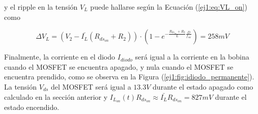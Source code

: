 y el ripple en la tensión $V_L$ puede hallarse según la Ecuación (\ref{ej1:eq:VL_on}) como

\begin{equation}
\Delta V_L = \left( V_2 - \bar{I_L} (R_{ds_{on}}+R_2) \right) \cdot (1-e^{-\frac{R_{ds_{on}} + R_2}{L}\frac{D}{f_{sw}}}) = 258mV
\end{equation}

Finalmente, la corriente en el diodo $I_{diodo}$ será igual a la corriente en la bobina cuando el MOSFET se encuentra apagado, y nula cuando el MOSFET se encuentra prendido, como se observa en la Figura (\ref{ej1:fig:idiodo_permanente}). La tensión $V_{ds}$ del MOSFET será igual a $13.3V$ durante el estado apagado como calculado en la sección anterior y $I_{L_{on}}(t)R_{ds_{on}} \approx \bar{I_L}R_{ds_{on}} = 827mV$ durante el estado encendido.

